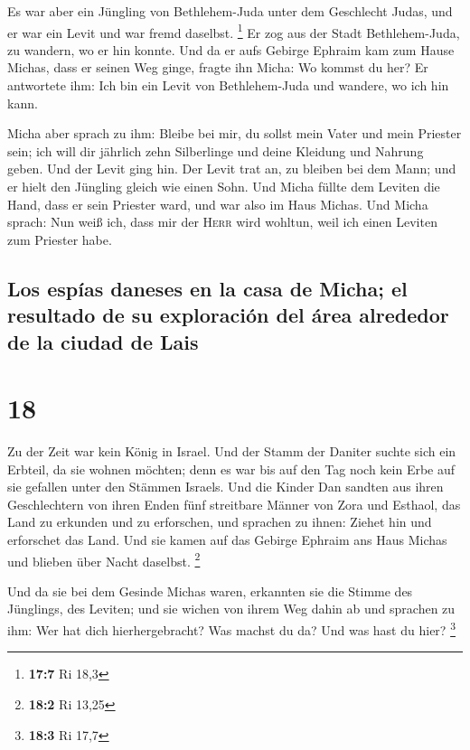  Es war aber ein Jüngling von Bethlehem-Juda unter dem
Geschlecht Judas, und er war ein Levit und war fremd daselbst.
\footnote{\textbf{17:7} Ri 18,3}  Er zog aus der Stadt
Bethlehem-Juda, zu wandern, wo er hin konnte. Und da er aufs Gebirge
Ephraim kam zum Hause Michas, dass er seinen Weg ginge, 
fragte ihn Micha: Wo kommst du her? Er antwortete ihm: Ich bin ein Levit
von Bethlehem-Juda und wandere, wo ich hin kann.

 Micha aber sprach zu ihm: Bleibe bei mir, du sollst mein
Vater und mein Priester sein; ich will dir jährlich zehn Silberlinge und
deine Kleidung und Nahrung geben. Und der Levit ging hin.
 Der Levit trat an, zu bleiben bei dem Mann; und er hielt
den Jüngling gleich wie einen Sohn.  Und Micha füllte dem
Leviten die Hand, dass er sein Priester ward, und war also im Haus
Michas.  Und Micha sprach: Nun weiß ich, dass mir der
\textsc{Herr} wird wohltun, weil ich einen Leviten zum Priester habe.

\hypertarget{los-espuxedas-daneses-en-la-casa-de-micha-el-resultado-de-su-exploraciuxf3n-del-uxe1rea-alrededor-de-la-ciudad-de-lais}{%
\subsection{Los espías daneses en la casa de Micha; el resultado de su
exploración del área alrededor de la ciudad de
Lais}\label{los-espuxedas-daneses-en-la-casa-de-micha-el-resultado-de-su-exploraciuxf3n-del-uxe1rea-alrededor-de-la-ciudad-de-lais}}

\hypertarget{section-17}{%
\section{18}\label{section-17}}

 Zu der Zeit war kein König in Israel. Und der Stamm der
Daniter suchte sich ein Erbteil, da sie wohnen möchten; denn es war bis
auf den Tag noch kein Erbe auf sie gefallen unter den Stämmen Israels.
 Und die Kinder Dan sandten aus ihren Geschlechtern von
ihren Enden fünf streitbare Männer von Zora und Esthaol, das Land zu
erkunden und zu erforschen, und sprachen zu ihnen: Ziehet hin und
erforschet das Land. Und sie kamen auf das Gebirge Ephraim ans Haus
Michas und blieben über Nacht daselbst. \footnote{\textbf{18:2} Ri 13,25}

 Und da sie bei dem Gesinde Michas waren, erkannten sie
die Stimme des Jünglings, des Leviten; und sie wichen von ihrem Weg
dahin ab und sprachen zu ihm: Wer hat dich hierhergebracht? Was machst
du da? Und was hast du hier? \footnote{\textbf{18:3} Ri 17,7}

